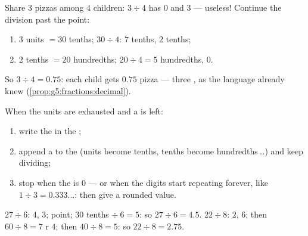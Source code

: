 \begin{example}\label{ex:g5:division:decimal}
Share $3$ pizzas among $4$ children: $3 \div 4$ has  $0$ and
 $3$ --- useless! Continue the division past the point:
\begin{enumerate}
  \item $3$ units $= 30$ tenths; $30 \div 4$: $7$ tenths, 
        $2$ tenths;
  \item $2$ tenths $= 20$ hundredths; $20 \div 4 = 5$ hundredths,
         $0$.
\end{enumerate}
So $3 \div 4 = 0.75$: each child gets $0.75$ pizza --- three
, as the  language already knew
(\cref{prop:g5:fractions:decimal}).
\end{example}

\begin{method}\label{met:g5:division:continue}
When the units are exhausted and a  is left:
\begin{enumerate}
  \item write the  in the ;
  \item append a  to the  (units become tenths, tenths
        become hundredths\,\dots) and keep dividing;
  \item stop when the  is $0$ --- or when the digits start
        repeating forever, like $1 \div 3 = 0.333\dots$: then give a
        rounded value.
\end{enumerate}
\end{method}

\begin{example}\label{ex:g5:division:continue}
$27 \div 6$:  $4$,  $3$; point; $30$ tenths
$\div\ 6 = 5$: so $27 \div 6 = 4.5$. \quad
$22 \div 8$: $2$,  $6$; then $60 \div 8 = 7$ r $4$;
then $40 \div 8 = 5$: so $22 \div 8 = 2.75$.
\end{example}

